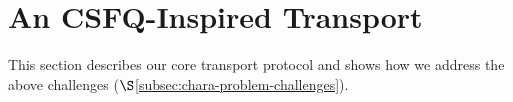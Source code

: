 

\section{An CSFQ-Inspired Transport}
\label{sec:proto}

This section describes our core transport protocol 
and shows how we address the above challenges (\(\S\)\ref{subsec:chara-problem-challenges}).

